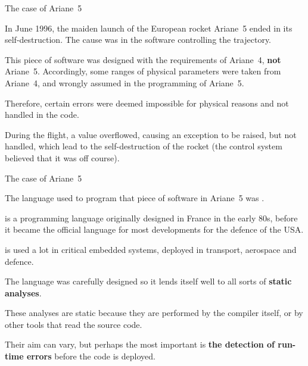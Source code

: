 \documentclass[compress,dvipdfmx]{beamer}
\begin{document}
\begin{frame}{The case of Ariane~5}

  In June 1996, the maiden launch of the European rocket Ariane~5
  ended in its self\hyp{}destruction. The cause was in the software
  controlling the trajectory.

  \bigskip

  This piece of software was designed with the requirements of
  Ariane~4, \textbf{not} Ariane~5. Accordingly, some ranges of
  physical parameters were taken from Ariane~4, and wrongly assumed in
  the programming of Ariane~5.

  \bigskip

  Therefore, certain errors were deemed impossible for physical
  reasons and not handled in the code.

  \bigskip

  During the flight, a value overflowed, causing an exception to be
  raised, but not handled, which lead to the self\hyp{}destruction of
  the rocket (the control system believed that it was off course).

\end{frame}


\begin{frame}{The case of Ariane~5}

  The language used to program that piece of software in Ariane~5 was
  \Ada.

  \bigskip

  \Ada is a programming language originally designed in France in the
  early 80s, before it became the official language for most
  developments for the defence of the USA.

  \bigskip

  \Ada is used a lot in critical embedded systems, deployed in
  transport, aerospace and defence.

  \bigskip

  The language was carefully designed so it lends itself well to all
  sorts of \textbf{static analyses}.

  \bigskip

  These analyses are static because they are performed by the \Ada
  compiler itself, or by other tools that read the source code.

  \bigskip

  Their aim can vary, but perhaps the most important is \textbf{the
    detection of run\hyp{}time errors} before the code is deployed.

\end{frame}
\end{document}
